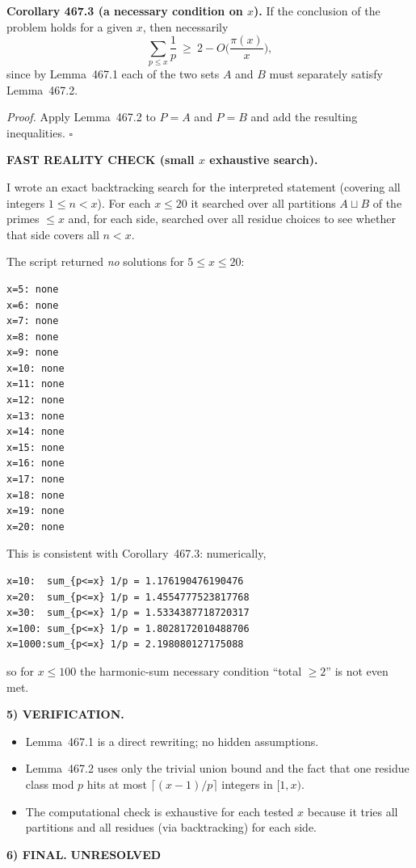 \medskip
\noindent\textbf{Corollary 467.3 (a necessary condition on $x$).}
If the conclusion of the problem holds for a given $x$, then necessarily
\[
\sum_{p\le x}\frac1p\ \ge\ 2 - O\Big(\frac{\pi(x)}{x}\Big),
\]
since by Lemma~467.1 each of the two sets $A$ and $B$ must separately satisfy Lemma~467.2.

\textit{Proof.}
Apply Lemma~467.2 to $P=A$ and $P=B$ and add the resulting inequalities. \hfill$\square$

\medskip
\noindent\textbf{FAST REALITY CHECK (small $x$ exhaustive search).}

I wrote an exact backtracking search for the interpreted statement (covering all integers $1\le n<x$). For each $x\le 20$ it searched over all partitions $A\sqcup B$ of the primes $\le x$ and, for each side, searched over all residue choices to see whether that side covers all $n<x$.

The script returned \emph{no} solutions for $5\le x\le 20$:
\begin{verbatim}
x=5: none
x=6: none
x=7: none
x=8: none
x=9: none
x=10: none
x=11: none
x=12: none
x=13: none
x=14: none
x=15: none
x=16: none
x=17: none
x=18: none
x=19: none
x=20: none
\end{verbatim}
This is consistent with Corollary~467.3: numerically,
\begin{verbatim}
x=10:  sum_{p<=x} 1/p = 1.176190476190476
x=20:  sum_{p<=x} 1/p = 1.4554777523817768
x=30:  sum_{p<=x} 1/p = 1.5334387718720317
x=100: sum_{p<=x} 1/p = 1.8028172010488706
x=1000:sum_{p<=x} 1/p = 2.198080127175088
\end{verbatim}
so for $x\le 100$ the harmonic-sum necessary condition ``total $\ge 2$'' is not even met.

\medskip
\noindent\textbf{5) VERIFICATION.}

\begin{itemize}
\item Lemma~467.1 is a direct rewriting; no hidden assumptions.
\item Lemma~467.2 uses only the trivial union bound and the fact that one residue class mod $p$ hits at most $\lceil (x-1)/p\rceil$ integers in $[1,x)$.
\item The computational check is exhaustive for each tested $x$ because it tries all partitions and all residues (via backtracking) for each side.
\end{itemize}

\medskip
\noindent\textbf{6) FINAL.} \textbf{UNRESOLVED}

